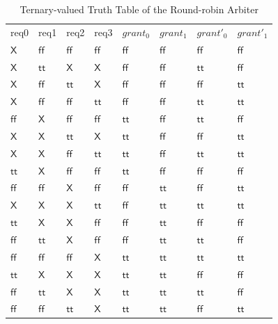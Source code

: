 \documentclass[final]{IEEEtran}
\begin{document}
\begin{center}
\begin{table}[tbp]
\caption{Ternary-valued Truth Table of the Round-robin Arbiter}
\label{truthTable}
\begin{center}
\begin{tabular}{llllllll}
req0 & req1 & req2 & req3 & $grant_0$ & $grant_1$ & $grant'_0$ & $grant'_1$ \\
$\mathsf{X}$ & $\mathsf{ff}$ & $\mathsf{ff}$ & $\mathsf{ff}$ &
$\mathsf{ff}$
& $\mathsf{ff}$ & $\mathsf{ff}$ & $\mathsf{ff}$ \\
$\mathsf{X}$ & $\mathsf{tt}$ & $\mathsf{X}$ & $\mathsf{X}$ &
$\mathsf{ff}$ &
$\mathsf{ff}$ & $\mathsf{tt}$ & $\mathsf{ff}$ \\
$\mathsf{X}$ & $\mathsf{ff}$ & $\mathsf{tt}$ & $\mathsf{X}$ &
$\mathsf{ff}$
& $\mathsf{ff}$ & $\mathsf{ff}$ & $\mathsf{tt}$ \\
$\mathsf{X}$ & $\mathsf{ff}$ & $\mathsf{ff}$ & $\mathsf{tt}$ &
$\mathsf{ff}$
& $\mathsf{ff}$ & $\mathsf{tt}$ & $\mathsf{tt}$ \\
$\mathsf{ff}$ & $\mathsf{X}$ & $\mathsf{ff}$ & $\mathsf{ff}$ &
$\mathsf{tt}$
& $\mathsf{ff}$ & $\mathsf{tt}$ & $\mathsf{ff}$ \\
$\mathsf{X}$ & $\mathsf{X}$ & $\mathsf{tt}$ & $\mathsf{X}$ &
$\mathsf{tt}$ &
$\mathsf{ff}$ & $\mathsf{ff}$ & $\mathsf{tt}$ \\
$\mathsf{X}$ & $\mathsf{X}$ & $\mathsf{ff}$ & $\mathsf{tt}$ &
$\mathsf{tt}$
& $\mathsf{ff}$ & $\mathsf{tt}$ & $\mathsf{tt}$ \\
$\mathsf{tt}$ & $\mathsf{X}$ & $\mathsf{ff}$ & $\mathsf{ff}$ &
$\mathsf{tt}$
& $\mathsf{ff}$ & $\mathsf{ff}$ & $\mathsf{ff}$ \\
$\mathsf{ff}$ & $\mathsf{ff}$ & $\mathsf{X}$ & $\mathsf{ff}$ &
$\mathsf{ff}$
& $\mathsf{tt}$ & $\mathsf{ff}$ & $\mathsf{tt}$ \\
$\mathsf{X}$ & $\mathsf{X}$ & $\mathsf{X}$ & $\mathsf{tt}$ &
$\mathsf{ff}$ &
$\mathsf{tt}$ & $\mathsf{tt}$ & $\mathsf{tt}$ \\
$\mathsf{tt}$ & $\mathsf{X}$ & $\mathsf{X}$ & $\mathsf{ff}$ &
$\mathsf{ff}$
& $\mathsf{tt}$ & $\mathsf{ff}$ & $\mathsf{ff}$ \\
$\mathsf{ff}$ & $\mathsf{tt}$ & $\mathsf{X}$ & $\mathsf{ff}$ &
$\mathsf{ff}$
& $\mathsf{tt}$ & $\mathsf{tt}$ & $\mathsf{ff}$ \\
$\mathsf{ff}$ & $\mathsf{ff}$ & $\mathsf{ff}$ & $\mathsf{X}$ &
$\mathsf{tt}$
& $\mathsf{tt}$ & $\mathsf{tt}$ & $\mathsf{tt}$ \\
$\mathsf{tt}$ & $\mathsf{X}$ & $\mathsf{X}$ & $\mathsf{X}$ &
$\mathsf{tt}$ &
$\mathsf{tt}$ & $\mathsf{ff}$ & $\mathsf{ff}$ \\
$\mathsf{ff}$ & $\mathsf{tt}$ & $\mathsf{X}$ & $\mathsf{X}$ &
$\mathsf{tt}$
& $\mathsf{tt}$ & $\mathsf{tt}$ & $\mathsf{ff}$ \\
$\mathsf{ff}$ & $\mathsf{ff}$ & $\mathsf{tt}$ & $\mathsf{X}$ &
$\mathsf{tt}$
& $\mathsf{tt}$ & $\mathsf{ff}$ & $\mathsf{tt}$%
\end{tabular}%
\end{center}
\end{table}
\end{center}
\end{document}
